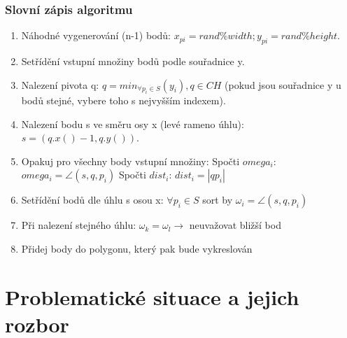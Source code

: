 \documentclass[a4paper,11pt,twoside]{article}
\begin{document}
\subsubsection{Slovní zápis algoritmu}
\begin{enumerate}
\item Náhodné vygenerování (n-1) bodů:  $x_{pi} = rand \% width; y_{pi} = rand \% height$.
\item Setřídění vstupní množiny bodů podle souřadnice y.
\item Nalezení pivota q:  $ q = min_{\forall p_i \in S} (y_i), q \in CH $ (pokud jsou souřadnice y u bodů stejné, vybere toho s nejvyšším indexem).
\item Nalezení bodu s ve směru osy x (levé rameno úhlu): $ s = (q.x()-1, q.y()) $.
\item Opakuj pro všechny body vstupní množiny:
\subitem Spočti $omega_i$: $ omega_i= \angle (s, q, p_i)$ 
\subitem Spočti $dist_i$: $ dist_i= |q p_i| $
\item Setřídění bodů dle úhlu s osou x: $ {\forall p_i \in S}$ sort by $ \omega_i = \angle (s, q, p_i)$ 
\item Při nalezení stejného úhlu: $ \omega_k = \omega_l \rightarrow $ neuvažovat bližší bod
\item Přidej body do polygonu, který pak bude vykreslován
\end{enumerate}

\newpage
\vspace*{-1cm}
\section{Problematické situace a jejich rozbor}
\end{document}
